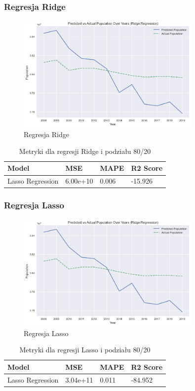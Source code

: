 \documentclass[11pt]{article}
\begin{document}
\subsubsection{Regresja Ridge}
\begin{figure}[H]
        \centering
        \includegraphics[width=0.8\textwidth]{images/ridge.png}
        \caption{Regresja Ridge}
\end{figure}
\begin{table}[H]
        \centering
        \begin{tabular}{|l|l|l|l|}
        \hline
        Model & MSE & MAPE & R2 Score \\ \hline
        Lasso Regression & 6.00e+10 & 0.006 & -15.926 \\ \hline
        \end{tabular}
        \caption{Metryki dla regresji Ridge i podziału 80/20}
        \end{table}
\subsubsection{Regresja Lasso}
\begin{figure}[H]
        \centering
        \includegraphics[width=0.8\textwidth]{images/lasso.png}
        \caption{Regresja Lasso}
\end{figure}
\begin{table}[H]
        \centering
        \begin{tabular}{|l|l|l|l|}
        \hline
        Model & MSE & MAPE & R2 Score \\ \hline
        Lasso Regression & 3.04e+11 & 0.011 & -84.952 \\ \hline
        \end{tabular}
        \caption{Metryki dla regresji Lasso i podziału 80/20}
        \end{table}
\end{document}
